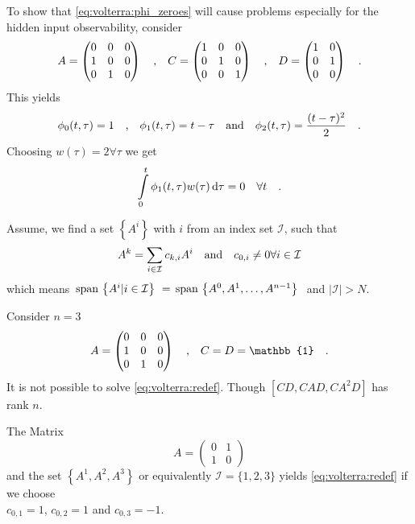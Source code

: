 \begin{example}
	To show that \eqref{eq:volterra:phi_zeroes} will cause problems especially for the 
	hidden input observability, consider 
	\begin{equation}
	A = \begin{pmatrix}
	0&0&0\\1&0&0\\0&1&0
	\end{pmatrix} \quad \text{,} \quad
	C = \begin{pmatrix}
	1&0&0\\0&1&0\\0&0&1
	\end{pmatrix} \quad \text{,} \quad
	D = \begin{pmatrix}
	1&0\\0&1 \\ 0&0
	\end{pmatrix} \quad .
	\end{equation}
	This yields
	\begin{equation}
	\phi_0(t,\tau) = 1 \quad \text{,} \quad \phi_1(t,\tau)=t-\tau \quad \text{and} \quad \phi_2(t,\tau)=
	\frac{(t-\tau)^2}{2} \quad .
	\end{equation}
	Choosing $w(\tau)=2\forall \tau$ we get
	\begin{equation}
	\int\limits_0^t \phi_1(t,\tau) w(\tau)\,\text{d}\tau = 0 \quad \forall t \quad .
	\end{equation}
\end{example}

Assume, we find a set $\left\{A^i \right\}$ with $i$ from an index set $\mathcal{I}$, 
such that 
\begin{equation}
A^k = \sum\limits_{i\in \mathcal{I}}  c_{k,i} A^i \quad \text{and} \quad
c_{0,i}\neq 0\forall i\in\mathcal{I} \label{eq:volterra:redef}
\end{equation}
which means $ \, \text{span}\, \left\{A^i|i\in \mathcal{I} \right\}  \,\, =  \, \text{span}\, \left\{ 
A^0,A^1,\ldots,A^{n-1} \right\}  \,\,$ and $|\mathcal{I}| > N$.

\begin{example} Consider $n=3$
	\begin{equation}
	A = \begin{pmatrix}
	0 & 0 & 0 \\ 1 & 0 & 0 \\ 0 & 1 & 0
	\end{pmatrix} \tab{,} C = D = \mathbb{1} \quad .
	\end{equation}
	It is not possible to solve \eqref{eq:volterra:redef}. Though 
	$[CD,CAD,CA^2D]$ has rank $n$.
\end{example}
\begin{example}
	The Matrix
	\begin{equation}
	A = \begin{pmatrix}
	0 & 1 \\ 1 & 0
	\end{pmatrix}
	\end{equation}
	and the set $\left\{ A^1 , A^2, A^3 \right\}$ or equivalently $
	\mathcal{I}=\{1,2,3\}$ 
	yields \eqref{eq:volterra:redef} 
	if we choose \\$c_{0,1} = 1$, $c_{0,2} =1$ and $c_{0,3}=-1$.
\end{example}

